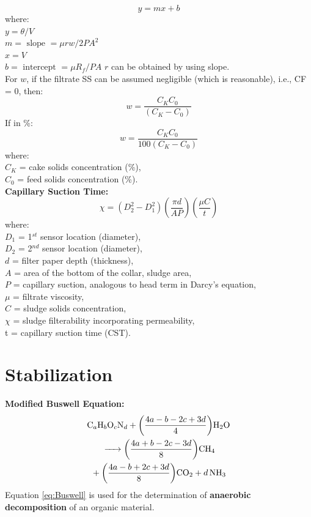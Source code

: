 \documentclass[a4paper, landscape]{article}
\begin{document}
\begin{multicols}{4}
\[
y=mx+b
\]
where:\\
$y = \theta/V$\\
$m = \text{ slope } = \mu rw / 2 PA^2$\\
$x = V$\\
$b = \text{ intercept } = \mu R_f / PA$
$r$ can be obtained by using slope.\\
For $w$, if the filtrate SS can be assumed negligible (which is reasonable), i.e., CF = 0, then:
\[
w = \frac{C_KC_0}{(C_K-C_0)}
\]
If in \%:
\[
w = \frac{C_KC_0}{100(C_K-C_0)}
\]
where:\\
$C_K$ = cake solids concentration (\%),\\
$C_0$ = feed solids concentration (\%).\\
\textbf{Capillary Suction Time:}
\[
\chi = (D_2^2 - D_1^2)\left(\frac{\pi d}{ A P }\right)\left(\frac{\mu C}{t}\right)
\]
where:\\
$D_1$ = 1$^{st}$ sensor location (diameter),\\
$D_2$ = 2$^{nd}$ sensor location (diameter),\\
$d$ = filter paper depth (thickness),\\
$A$ = area of the bottom of the collar, sludge area,\\
$P$ = capillary suction, analogous to head term in Darcy's equation,\\
$\mu$ = filtrate viscosity,\\
$C$ = sludge solids concentration,\\
$\chi$ = sludge filterability incorporating permeability,\\
t = capillary suction time (CST).
\section*{Stabilization}
\textbf{Modified Buswell Equation:}
\begin{multline}
\ce{C_aH_bO_cN_d + $\left(\frac{4a - b - 2c + 3d}{4}\right)$H2O\\ -> $\left(\frac{4a + b - 2c - 3d}{8}\right)$CH4 \\+ $\left(\frac{4a - b + 2c + 3d}{8}\right)$CO2 + $d$NH3} \label{eq:Buswell}
\end{multline}
Equation \ref{eq:Buswell} is used for the determination of \textbf{anaerobic decomposition} of an organic material.
\end{multicols}
\end{document}
